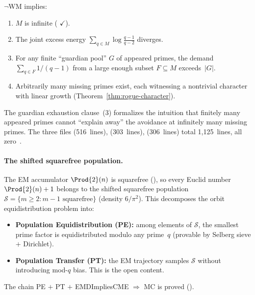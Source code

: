 \begin{theorem}
\label{thm:spectral-conspiracy}
$\neg\mathrm{WM}$ implies:
\begin{enumerate}[nosep]
\item $M$ is infinite
  (
  {\color{leanink}$\checkmark$}).
\item The joint excess energy $\sum_{q \in M} \log\frac{q-1}{q-2}$ diverges.
\item For any finite ``guardian pool'' $G$ of appeared primes, the
  demand $\sum_{q \in F} 1/(q{-}1)$ from a large enough subset
  $F \subseteq M$ exceeds~$|G|$.
\item Arbitrarily many missing primes exist, each witnessing a nontrivial
  character with linear growth (Theorem~\textup{\ref{thm:rogue-character}}).
\end{enumerate}
\end{theorem}

\noindent
The guardian exhaustion clause~(3) formalizes the intuition that finitely
many appeared primes cannot ``explain away'' the avoidance at infinitely
many missing primes.  The three files
 (516~lines),
 (303~lines),
 (306~lines)
total 1{,}125~lines, all zero~.

\paragraph{The shifted squarefree population.}
The EM accumulator $\Prod{2}(n)$ is squarefree
(),
so every Euclid number $\Prod{2}(n)+1$ belongs to the shifted
squarefree population
$\mathcal{S} = \{m \geq 2 : m{-}1 \text{ squarefree}\}$
(density $6/\pi^2$).  This decomposes the orbit equidistribution
problem into:
\begin{itemize}[nosep]
\item \textbf{Population Equidistribution (PE):} among elements of
  $\mathcal{S}$, the smallest prime factor is equidistributed modulo
  any prime~$q$ (provable by Selberg sieve $+$ Dirichlet).
\item \textbf{Population Transfer (PT):} the EM trajectory samples
  $\mathcal{S}$ without introducing mod-$q$ bias.
  This is the open content.
\end{itemize}
The chain PE $+$ PT $+$ EMDImpliesCME $\Longrightarrow$ MC is proved
().

